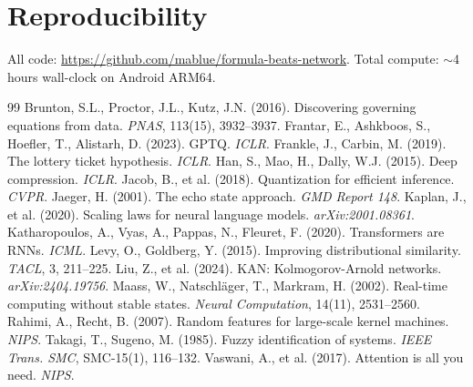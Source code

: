\documentclass[11pt,a4paper]{article}
\begin{document}
\section*{Reproducibility}
All code: \url{https://github.com/mablue/formula-beats-network}. Total compute: $\sim$4 hours wall-clock on Android ARM64.

\begin{thebibliography}{99}
 Brunton, S.L., Proctor, J.L., Kutz, J.N. (2016). Discovering governing equations from data. \textit{PNAS}, 113(15), 3932--3937.
 Frantar, E., Ashkboos, S., Hoefler, T., Alistarh, D. (2023). GPTQ. \textit{ICLR}.
 Frankle, J., Carbin, M. (2019). The lottery ticket hypothesis. \textit{ICLR}.
 Han, S., Mao, H., Dally, W.J. (2015). Deep compression. \textit{ICLR}.
 Jacob, B., et al. (2018). Quantization for efficient inference. \textit{CVPR}.
 Jaeger, H. (2001). The echo state approach. \textit{GMD Report 148}.
 Kaplan, J., et al. (2020). Scaling laws for neural language models. \textit{arXiv:2001.08361}.
 Katharopoulos, A., Vyas, A., Pappas, N., Fleuret, F. (2020). Transformers are RNNs. \textit{ICML}.
 Levy, O., Goldberg, Y. (2015). Improving distributional similarity. \textit{TACL}, 3, 211--225.
 Liu, Z., et al. (2024). KAN: Kolmogorov-Arnold networks. \textit{arXiv:2404.19756}.
 Maass, W., Natschl\"ager, T., Markram, H. (2002). Real-time computing without stable states. \textit{Neural Computation}, 14(11), 2531--2560.
 Rahimi, A., Recht, B. (2007). Random features for large-scale kernel machines. \textit{NIPS}.
 Takagi, T., Sugeno, M. (1985). Fuzzy identification of systems. \textit{IEEE Trans. SMC}, SMC-15(1), 116--132.
 Vaswani, A., et al. (2017). Attention is all you need. \textit{NIPS}.
\end{thebibliography}
\end{document}
